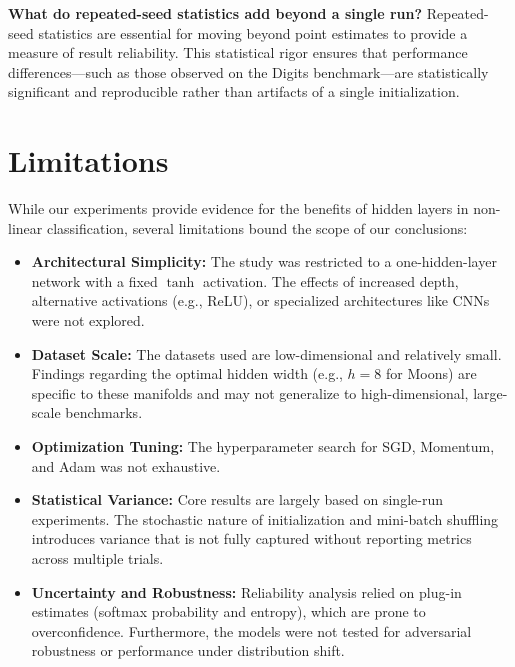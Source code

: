 \documentclass[sigconf,screen,nonacm]{acmart}
\newcommand{\tanhact}{\tanh}
\begin{document}
\medskip
\noindent\textbf{What do repeated-seed statistics add beyond a single run?}
Repeated-seed statistics are essential for moving beyond point estimates to provide a measure of result reliability. This statistical rigor ensures that performance differences—such as those observed on the Digits benchmark—are statistically significant and reproducible rather than artifacts of a single initialization.

\section{Limitations}

While our experiments provide evidence for the benefits of hidden layers in non-linear classification, several limitations bound the scope of our conclusions:

\begin{itemize}[leftmargin=*]
    \item \textbf{Architectural Simplicity:} The study was restricted to a one-hidden-layer network with a fixed $\tanhact$ activation. The effects of increased depth, alternative activations (e.g., ReLU), or specialized architectures like CNNs were not explored.
    
    \item \textbf{Dataset Scale:} The datasets used are low-dimensional and relatively small. Findings regarding the optimal hidden width (e.g., $h=8$ for Moons) are specific to these manifolds and may not generalize to high-dimensional, large-scale benchmarks.
    
    \item \textbf{Optimization Tuning:} The hyperparameter search for SGD, Momentum, and Adam was not exhaustive.
    
    \item \textbf{Statistical Variance:} Core results are largely based on single-run experiments. The stochastic nature of initialization and mini-batch shuffling introduces variance that is not fully captured without reporting metrics across multiple trials.
    
    \item \textbf{Uncertainty and Robustness:} Reliability analysis relied on plug-in estimates (softmax probability and entropy), which are prone to overconfidence. Furthermore, the models were not tested for adversarial robustness or performance under distribution shift.
\end{itemize}
\end{document}
